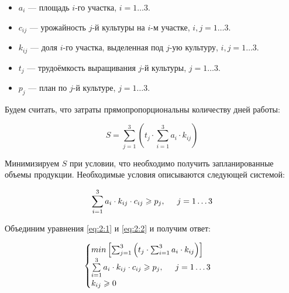 \begin{itemize}

	\item $a_i$ --- площадь $i$-го участка, $i = 1 \dots 3$.
	
	\item $c_{ij}$ --- урожайность $j$-й культуры на $i$-м участке, $i, j = 1 \dots 3$.

	\item $k_{ij}$ --- доля $i$-го участка, выделенная под $j$-ую культуру,  $i, j = 1 \dots 3$.
	
	\item $t_j$ --- трудоёмкость выращивания $j$-й культуры, $j = 1 \dots 3$.

	\item $p_j$ --- план по $j$-й культуре, $j = 1 \dots 3$.

\end{itemize}

Будем считать, что затраты прямопропорциональны количеству дней работы:

\begin{equation}
	\label{eq:2:1}
	S = \sum_{j = 1}^{3} \left( t_j \cdot \sum_{i = 1}^{3} a_i \cdot k_{ij} \right)
\end{equation} 

Минимизируем $S$ при условии, что необходимо получить запланированные объемы продукции. Необходимые условия описываются следующей системой:

\begin{equation}
	\label{eq:2:2}
	\sum_{i = 1}^{3} a_i \cdot k_{ij} \cdot c_{ij} \geq p_j, \hspace{5mm} j = 1 \dots 3
\end{equation}

Объединим уравнения \ref{eq:2:1} и \ref{eq:2:2} и получим ответ:

\begin{equation}
\label{eq:2:3}
\begin{cases}
	min \left[ \sum_{j = 1}^{3} \left( t_j \cdot \sum_{i = 1}^{3} a_i \cdot k_{ij} \right) \right] \\
	\sum\limits_{i = 1}^{3} a_i \cdot k_{ij} \cdot c_{ij} \geq p_j, \hspace{5mm} j = 1 \dots 3 \\
	k_{ij} \geq 0
\end{cases}
\end{equation}

